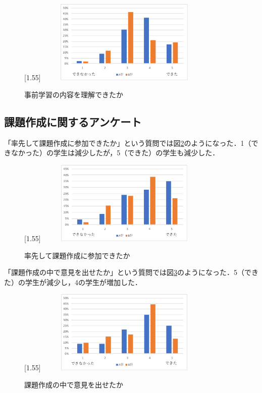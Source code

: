 \documentclass[a4j,11pt]{jsarticle}
\begin{document}
\begin{figure}[h]
\begin{center}
\scalebox{1.2}[1.55]{
 \includegraphics[clip,width=85mm,height=40mm]{anke4.pdf}
 }
\end{center}
 \caption{事前学習の内容を理解できたか}
 \label{anke4}
\end{figure}



\newpage

\subsection{課題作成に関するアンケート}
「率先して課題作成に参加できたか」という質問では図\ref{anke5}のようになった．1（できなかった）の学生は減少したが，5（できた）の学生も減少した．

\begin{figure}[h]
\begin{center}
\scalebox{1.2}[1.55]{
 \includegraphics[clip,width=85mm,height=40mm]{anke5.pdf}
 }
\end{center}
 \caption{率先して課題作成に参加できたか}
 \label{anke5}
\end{figure}



「課題作成の中で意見を出せたか」という質問では図\ref{anke6}のようになった．5（できた）の学生が減少し，4の学生が増加した．


\begin{figure}[h]
\begin{center}
\scalebox{1.2}[1.55]{
 \includegraphics[clip,width=85mm,height=40mm]{anke6.pdf}
 }
\end{center}
 \caption{課題作成の中で意見を出せたか}
 \label{anke6}
\end{figure}
\end{document}
